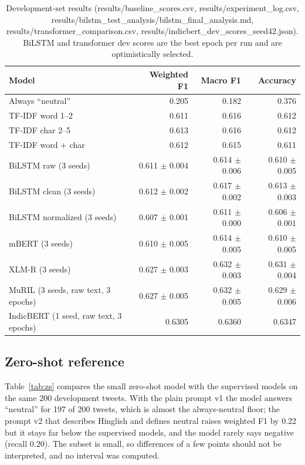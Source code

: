 \begin{table}[h]
\centering
\begin{tabular}{lrrr}
\hline
Model & Weighted F1 & Macro F1 & Accuracy \\
\hline
Always ``neutral'' & 0.205 & 0.182 & 0.376 \\
TF-IDF word 1--2 & 0.611 & 0.616 & 0.612 \\
TF-IDF char 2--5 & 0.613 & 0.616 & 0.612 \\
TF-IDF word + char & 0.612 & 0.615 & 0.611 \\
BiLSTM raw (3 seeds) & 0.611 $\pm$ 0.004 & 0.614 $\pm$ 0.006 & 0.610 $\pm$ 0.005 \\
BiLSTM clean (3 seeds) & 0.612 $\pm$ 0.002 & 0.617 $\pm$ 0.002 & 0.613 $\pm$ 0.003 \\
BiLSTM normalized (3 seeds) & 0.607 $\pm$ 0.001 & 0.611 $\pm$ 0.000 & 0.606 $\pm$ 0.001 \\
mBERT (3 seeds) & 0.610 $\pm$ 0.005 & 0.614 $\pm$ 0.005 & 0.610 $\pm$ 0.005 \\
XLM-R (3 seeds) & 0.627 $\pm$ 0.003 & 0.632 $\pm$ 0.003 & 0.631 $\pm$ 0.004 \\
MuRIL (3 seeds, raw text, 3 epochs) & 0.627 $\pm$ 0.005 & 0.632 $\pm$ 0.005 & 0.629 $\pm$ 0.006 \\
IndicBERT (1 seed, raw text, 3 epochs) & 0.6305 & 0.6360 & 0.6347 \\
\hline
\end{tabular}
\caption{Development-set results (results/baseline\_scores.csv, results/experiment\_log.csv, results/bilstm\_test\_analysis/bilstm\_final\_analysis.md,
results/transformer\_comparison.csv, results/indicbert\_dev\_scores\_seed42.json). BiLSTM and transformer dev scores are the best epoch per run and are optimistically selected.}
\label{tab:dev}
\end{table}

\subsection{Zero-shot reference}
Table~\ref{tab:zs} compares the small zero-shot model with the supervised models on the same 200 development tweets. With the
plain prompt v1 the model answers ``neutral'' for 197 of 200 tweets, which is almost the always-neutral floor; the prompt v2
that describes Hinglish and defines neutral raises weighted F1 by 0.22 but it stays far below the supervised models, and the
model rarely says negative (recall 0.20). The subset is small, so differences of a few points should not be interpreted, and no
interval was computed.

